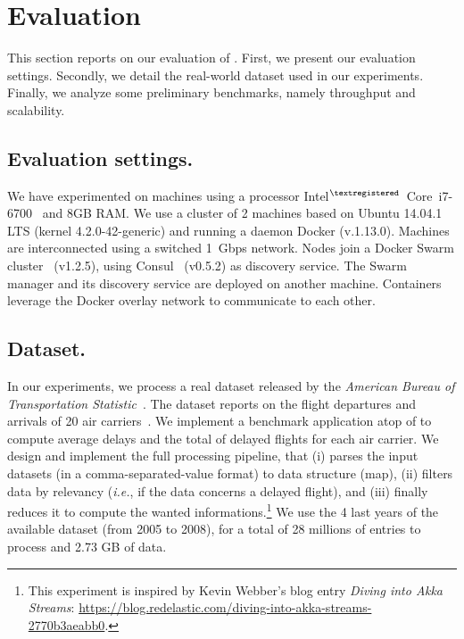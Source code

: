 \section{Evaluation}
\label{sec:eval}


This section reports on our evaluation of \SYS.
First, we present our evaluation settings.
Secondly, we detail the real-world dataset used in our experiments.
Finally, we analyze some preliminary benchmarks, namely throughput and scalability.


\subsection{Evaluation settings.}
We have experimented on machines using a processor Intel$^{\tiny{\textregistered}}$~Core\texttrademark~i7-6700~\cite{intel:i7_6700} and 8GB RAM.
We use a cluster of 2 machines based on Ubuntu 14.04.1 LTS (kernel 4.2.0-42-generic) and running a daemon Docker (v.1.13.0).
Machines are interconnected using a switched 1~Gbps network.
Nodes join a Docker Swarm cluster~\cite{docker:swarm_2016} (v1.2.5), using Consul~\cite{consul} (v0.5.2) as discovery service.
The Swarm manager and its discovery service are deployed on another machine.
Containers leverage the Docker overlay network to communicate to each other.



\subsection{Dataset.}
In our experiments, we process a real dataset released by the \emph{American Bureau of Transportation Statistic}~\cite{rita:bts}.
The dataset reports on the flight departures and arrivals of 20 air carriers~\cite{statistical_computing:data}.
We implement a benchmark application atop of \SYS to compute average delays and the total of delayed flights for each air carrier.
We design and implement the full processing pipeline, that (i) parses the input datasets (in a comma-separated-value format) to data structure (\textsf{map}), (ii) filters data by relevancy (\emph{i.e.}, if the data concerns a delayed flight), and (iii) finally reduces it to compute the wanted informations.\footnote{This experiment is inspired by Kevin Webber's blog entry \emph{Diving into Akka Streams}: \url{https://blog.redelastic.com/diving-into-akka-streams-2770b3aeabb0}.}
We use the 4 last years of the available dataset (from 2005 to 2008), for a total of 28 millions of entries to process and 2.73 GB of data.


